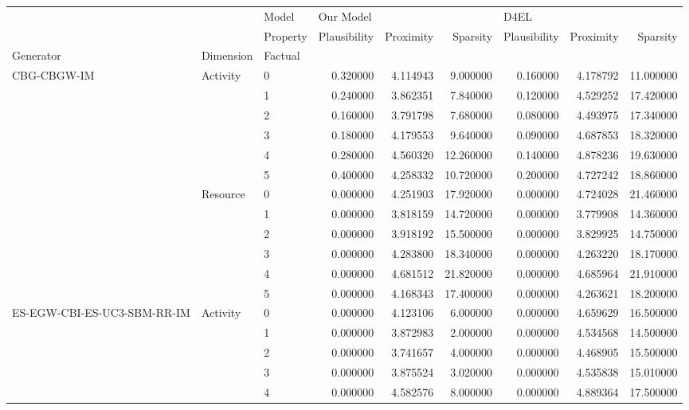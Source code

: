 \begin{tabular}{lllrrrrrr}
\toprule
 &  & Model & \multicolumn{3}{l}{Our Model} & \multicolumn{3}{l}{D4EL} \\
 &  & Property & Plausibility & Proximity & Sparsity & Plausibility & Proximity & Sparsity \\
Generator & Dimension & Factual &  &  &  &  &  &  \\
\midrule
\multirow[c]{12}{*}{CBG-CBGW-IM} & \multirow[c]{6}{*}{Activity} & 0 & 0.320000 & 4.114943 & 9.000000 & 0.160000 & 4.178792 & 11.000000 \\
 &  & 1 & 0.240000 & 3.862351 & 7.840000 & 0.120000 & 4.529252 & 17.420000 \\
 &  & 2 & 0.160000 & 3.791798 & 7.680000 & 0.080000 & 4.493975 & 17.340000 \\
 &  & 3 & 0.180000 & 4.179553 & 9.640000 & 0.090000 & 4.687853 & 18.320000 \\
 &  & 4 & 0.280000 & 4.560320 & 12.260000 & 0.140000 & 4.878236 & 19.630000 \\
 &  & 5 & 0.400000 & 4.258332 & 10.720000 & 0.200000 & 4.727242 & 18.860000 \\
\cline{2-3}
 & \multirow[c]{6}{*}{Resource} & 0 & 0.000000 & 4.251903 & 17.920000 & 0.000000 & 4.724028 & 21.460000 \\
 &  & 1 & 0.000000 & 3.818159 & 14.720000 & 0.000000 & 3.779908 & 14.360000 \\
 &  & 2 & 0.000000 & 3.918192 & 15.500000 & 0.000000 & 3.829925 & 14.750000 \\
 &  & 3 & 0.000000 & 4.283800 & 18.340000 & 0.000000 & 4.263220 & 18.170000 \\
 &  & 4 & 0.000000 & 4.681512 & 21.820000 & 0.000000 & 4.685964 & 21.910000 \\
 &  & 5 & 0.000000 & 4.168343 & 17.400000 & 0.000000 & 4.263621 & 18.200000 \\
\cline{1-3} \cline{2-3}
\multirow[c]{12}{*}{ES-EGW-CBI-ES-UC3-SBM-RR-IM} & \multirow[c]{6}{*}{Activity} & 0 & 0.000000 & 4.123106 & 6.000000 & 0.000000 & 4.659629 & 16.500000 \\
 &  & 1 & 0.000000 & 3.872983 & 2.000000 & 0.000000 & 4.534568 & 14.500000 \\
 &  & 2 & 0.000000 & 3.741657 & 4.000000 & 0.000000 & 4.468905 & 15.500000 \\
 &  & 3 & 0.000000 & 3.875524 & 3.020000 & 0.000000 & 4.535838 & 15.010000 \\
 &  & 4 & 0.000000 & 4.582576 & 8.000000 & 0.000000 & 4.889364 & 17.500000 \\

\end{tabular}
